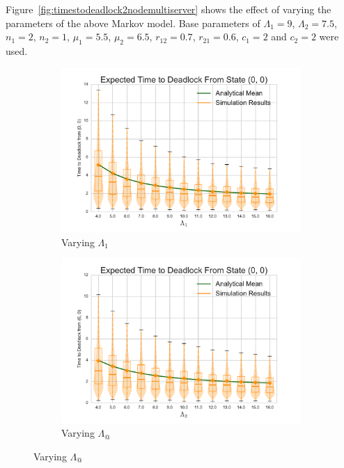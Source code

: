 \documentclass{article}
\begin{document}
Figure~\ref{fig:timestodeadlock2nodemultiserver} shows the effect of varying the parameters of the above Markov model.
Base parameters of $\Lambda_1 = 9$, $\Lambda_2 = 7.5$, $n_1 = 2$, $n_2 = 1$, $\mu_1 = 5.5$, $\mu_2 = 6.5$, $r_{12} = 0.7$, $r_{21} = 0.6$, $c_1 = 2$ and $c_2 = 2$ were used.

\begin{figure}[!htbp]
  \begin{subfigure}[b]{0.333\textwidth}
    \includegraphics[width=\textwidth]{images/varyL1_2Nms}
    \caption{Varying $\Lambda_1$}
    \label{fig:2Nms_L1}
  \end{subfigure}
  \begin{subfigure}[b]{0.333\textwidth}
    \includegraphics[width=\textwidth]{images/varyL2_2Nms}
    \caption{Varying $\Lambda_@$}
    \label{fig:2Nms_L2}
  \end{subfigure}

\end{figure}
\end{document}
